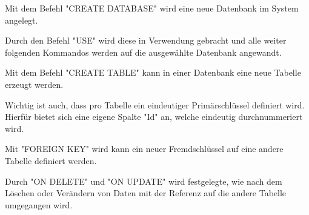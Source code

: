 

Mit dem Befehl "CREATE DATABASE" wird eine neue Datenbank im System angelegt.

Durch den Befehl "USE" wird diese in Verwendung gebracht und alle weiter folgenden Kommandos werden auf die ausgewählte Datenbank angewandt.


Mit dem Befehl "CREATE TABLE" kann in einer Datenbank eine neue Tabelle erzeugt werden.

Wichtig ist auch, dass pro Tabelle ein eindeutiger Primärschlüssel definiert wird. Hierfür bietet sich eine eigene Spalte "Id" an, welche eindeutig durchnummeriert wird.


Mit "FOREIGN KEY" wird kann ein neuer Fremdschlüssel auf eine andere Tabelle definiert werden.

Durch "ON DELETE" und "ON UPDATE" wird festgelegte, wie nach dem Löschen oder Verändern von Daten mit der Referenz auf die andere Tabelle umgegangen wird.

